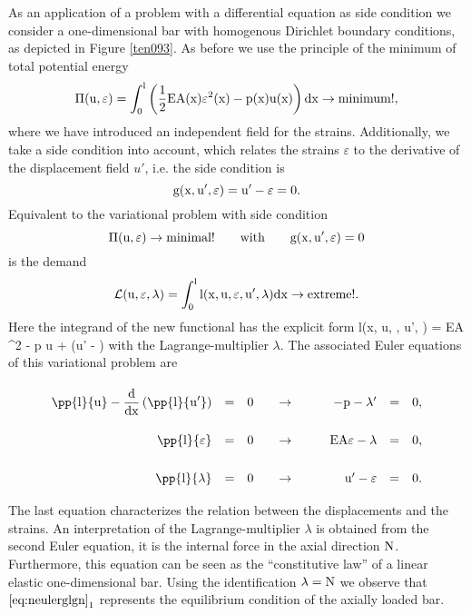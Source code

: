 As an application of a problem with a differential equation as 
side condition we consider a one-dimensional bar
with homogenous Dirichlet boundary conditions, as depicted in Figure 
\ref{ten093}.
As before we use the principle of the minimum of total potential energy 
\begin{equation} 
\rm
\Pi(u, \varepsilon) = 
\displaystyle \int_0^l \left( \dfrac{1}{2} EA(x) \varepsilon^2(x) - 
p(x) u(x) \right) dx 
\rightarrow \mbox{minimum}! ,
\label{eq:nvarprobbsp1}
\end{equation}
where we have introduced an independent field for the strains. 
Additionally, we take  a side condition into account, which relates
the strains $\varepsilon$ to the derivative of the displacement field 
$u'$, i.e. the side condition is 
\begin{equation} 
\rm
g(x, u', \varepsilon) = u' - \varepsilon = 0.
\label{eq:nvarprobbsp2}
\end{equation}
Equivalent to the variational problem with side condition 
\begin{equation} 
\rm
\Pi(u, \varepsilon)  \rightarrow \mbox{minimal}! 
\qquad \mbox{with} \qquad g(x, u', \varepsilon) = 0
\label{eq:nvarprobbsp}
\end{equation}
is the demand  
\begin{equation}
\rm
\mathcal{L}(u, \varepsilon, \lambda) = \int_0^l 
l(x, u, \varepsilon, u', \lambda)
dx 
\rightarrow \mbox{extreme!}.
\end{equation}
Here the integrand of the new functional has the explicit form 
\eb
\rm
l(x, u, \varepsilon, u', \lambda) =  EA \varepsilon^2 - p \; u +
\lambda (u' - \varepsilon) 
\ee
with the Lagrange-multiplier $\lambda$.
The associated Euler equations of this variational problem are
\begin{equation} 
\renewcommand{\arraystretch}{2.5}
\begin{array}{rclcrcc}
\rm
\displaystyle \pp{l}{u} - \dfrac{d}{dx} \left( \pp{l}{u'} \right)  & = & 0
&  \quad\rightarrow\qquad & 
\rm - p - \lambda' & = & 0 ,
\\ 
\displaystyle \rm \pp{l}{\varepsilon} & = & 0  
& \quad\rightarrow\qquad &  
\rm EA \varepsilon - \lambda & = & 0 ,
\\ 
\displaystyle \rm \pp{l}{\lambda} & = & 0 
& \quad\rightarrow\qquad &  
\rm  u' - \varepsilon & = & 0 . 
\end{array}
\label{eq:neulerglgn}
\end{equation}
The last equation characterizes the relation between the displacements 
and the strains. 
An interpretation of the 
Lagrange-multiplier $\lambda $ is obtained from
the second Euler equation, it is the internal force in the axial direction
$\rm N$. Furthermore, this equation can be seen as the ``constitutive law''
of a linear elastic one-dimensional bar. 
Using the identification $\rm \lambda = N$
we observe that $\ref{eq:neulerglgn}_1$ represents the equilibrium 
condition of the axially loaded bar. 

